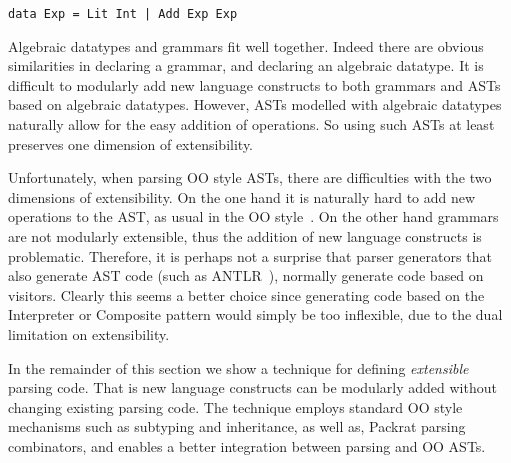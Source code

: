 \begin{lstlisting}
data Exp = Lit Int | Add Exp Exp
\end{lstlisting}

Algebraic datatypes and grammars fit well together. Indeed there are
obvious similarities in declaring a grammar, and declaring an
algebraic datatype. It is difficult to modularly add new language
constructs to both grammars and ASTs based on algebraic datatypes. However,
ASTs modelled with algebraic datatypes naturally allow for the easy
addition of operations. So using such ASTs at least preserves one
dimension of extensibility.

Unfortunately, when parsing OO style ASTs, there are difficulties with
the two dimensions of extensibility. On the one hand it is naturally hard to
add new operations to the AST, as usual in the OO
style~\cite{wadler1998expression}. On the other hand
grammars are not modularly extensible, thus the addition of new
language constructs is problematic. Therefore,
it is perhaps not a surprise that parser generators that also generate
AST code (such as ANTLR~\cite{antlr1995}), normally generate code based on
visitors. Clearly this seems a better choice since generating code
based on the {\sc Interpreter} or {\sc Composite} pattern would
simply be too inflexible, due to the dual limitation on extensibility.

In the remainder of this section we show a technique for
defining \emph{extensible} parsing code. That is new
language constructs can be modularly added without changing
existing parsing code. The technique employs standard OO
style mechanisms such as subtyping and inheritance, as well as,
Packrat parsing combinators, and enables a better integration between
parsing and OO ASTs.


